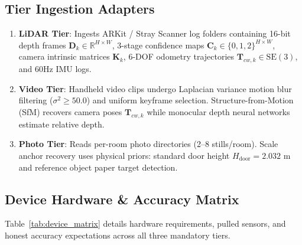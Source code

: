 \documentclass[10pt,twocolumn,a4paper]{article}
\begin{document}
\subsection{Tier Ingestion Adapters}
\begin{enumerate}[leftmargin=*]
    \item \textbf{LiDAR Tier}: Ingests ARKit / Stray Scanner log folders containing 16-bit depth frames $\mathbf{D}_k \in \mathbb{R}^{H \times W}$, 3-stage confidence maps $\mathbf{C}_k \in \{0,1,2\}^{H \times W}$, camera intrinsic matrices $\mathbf{K}_k$, 6-DOF odometry trajectories $\mathbf{T}_{cw,k} \in \mathrm{SE}(3)$, and 60Hz IMU logs.
    \item \textbf{Video Tier}: Handheld video clips undergo Laplacian variance motion blur filtering ($\sigma^2 \ge 50.0$) and uniform keyframe selection. Structure-from-Motion (SfM) recovers camera poses $\mathbf{T}_{cw,k}$ while monocular depth neural networks estimate relative depth.
    \item \textbf{Photo Tier}: Reads per-room photo directories (2--8 stills/room). Scale anchor recovery uses physical priors: standard door height $H_{\text{door}} = 2.032\text{ m}$ and reference object paper target detection.
\end{enumerate}

\subsection{Device Hardware \& Accuracy Matrix}
Table~\ref{tab:device_matrix} details hardware requirements, pulled sensors, and honest accuracy expectations across all three mandatory tiers.

\begin{table}[h]
\centering
\caption{Device Hardware and Accuracy Matrix}
\label{tab:device_matrix}
\end{table}
\end{document}
